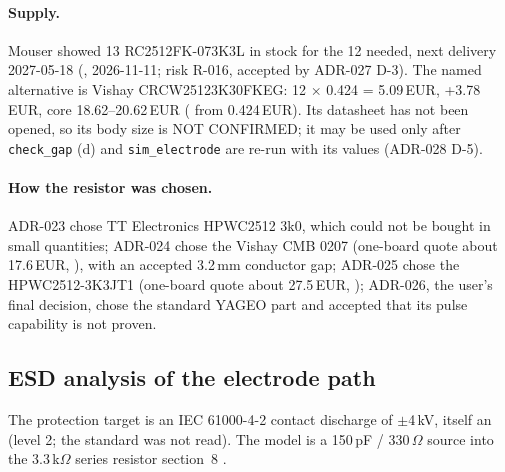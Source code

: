 \paragraph{Supply.} Mouser showed 13 RC2512FK-073K3L in stock for the 12 needed,
next delivery 2027-05-18 (, 2026-11-11; risk R-016, accepted by
ADR-027 D-3). The named alternative is Vishay CRCW25123K30FKEG: 12 $\times$ 0.424
= 5.09\,EUR, +3.78\,EUR, core 18.62--20.62\,EUR ( from
 0.424\,EUR). Its datasheet has not been opened, so its body size is
NOT CONFIRMED; it may be used only after \nolinkurl{check_gap} (d) and
\nolinkurl{sim_electrode} are re-run with its values (ADR-028 D-5).

\paragraph{How the resistor was chosen.} ADR-023 chose TT Electronics HPWC2512
3k0, which could not be bought in small quantities; ADR-024 chose the Vishay CMB
0207 (one-board quote about 17.6\,EUR, ), with an accepted 3.2\,mm
conductor gap; ADR-025 chose the HPWC2512-3K3JT1 (one-board quote about 27.5\,EUR,
); ADR-026, the user's final decision, chose the standard YAGEO
part and accepted that its pulse capability is not proven.

\subsection{ESD analysis of the electrode path}
\label{sec:v13-esd}

The protection target is an IEC 61000-4-2 contact discharge of $\pm$4\,kV, itself
an  (level 2; the standard was not read). The model is a
150\,pF / 330\,$\Omega$ source into the 3.3\,k$\Omega$ series resistor
 section~8 .


